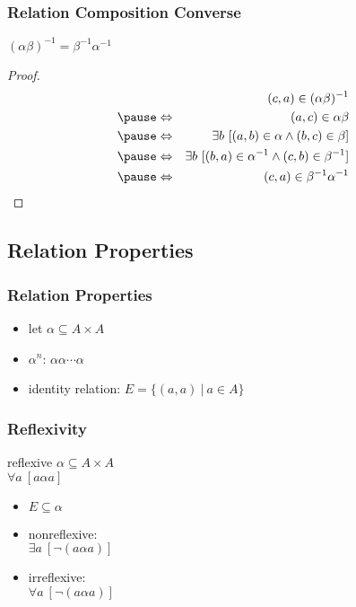 \documentclass[dvipsnames]{beamer}
\begin{document}
\begin{frame}
  \frametitle{Relation Composition Converse}

  \begin{theorem}
    $(\alpha \beta)^{-1} = \beta^{-1} \alpha^{-1}$
  \end{theorem}

  \pause
  \begin{proof}
    \begin{eqnarray*}
      &                 & (c,a) \in (\alpha \beta)^{-1}\\\pause
      & \Leftrightarrow & (a,c) \in \alpha \beta\\\pause
      & \Leftrightarrow & \exists b~[(a,b) \in \alpha
                              \wedge (b,c) \in \beta]\\\pause
      & \Leftrightarrow & \exists b~[(b,a) \in \alpha^{-1}
                              \wedge (c,b) \in \beta^{-1}]\\\pause
      & \Leftrightarrow & (c,a) \in \beta^{-1}\alpha^{-1}
    \end{eqnarray*}
  \end{proof}
\end{frame}

\subsection{Relation Properties}

\begin{frame}
  \frametitle{Relation Properties}

  \begin{itemize}
    \item let $\alpha \subseteq A \times A$

    \pause
    \medskip
    \item $\alpha^n$: $\alpha \alpha \cdots \alpha$

    \pause
    \medskip
    \item \alert{identity relation}: $E = \{(a,a)~|~a \in A\}$
  \end{itemize}
\end{frame}

\begin{frame}
  \frametitle{Reflexivity}

  \begin{block}{reflexive}
    $\alpha \subseteq A \times A$\\
    $\forall a~[a \alpha a]$
  \end{block}

  \pause
  \begin{itemize}
    \item $E \subseteq \alpha$

    \pause
    \item nonreflexive:\\
      $\exists a~[\neg (a \alpha a)]$

    \pause
    \item irreflexive:\\
      $\forall a~[\neg (a \alpha a)]$
  \end{itemize}
\end{frame}
\end{document}
